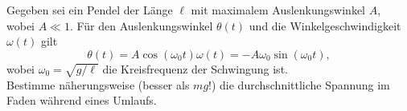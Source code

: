 \begin{Exercise}[title = Seilkraft, origin = {Morin - Classical Mechanics}, difficulty = 3, label = pucks]
Gegeben sei ein Pendel der Länge $\ell$ mit maximalem Auslenkungswinkel $A$, wobei $A \ll 1$. Für den Auslenkungswinkel $\theta(t)$ und die Winkelgeschwindigkeit $\omega(t)$ gilt
\begin{subequations}\label{averagetension:simpleharmonic}
	\begin{equation}\label{averagetension:angle}
		\theta(t) = A\cos\left(\omega_0t\right)
	\end{equation}
	\begin{equation}\label{averagtension:angularvel}
		\omega(t) = -A\omega_0\sin\left(\omega_0t\right),
	\end{equation}
\end{subequations}
wobei $\omega_0 = \sqrt{g/\ell}$ die Kreisfrequenz der Schwingung ist.\\
Bestimme näherungsweise (besser als $mg$!) die durchschnittliche Spannung im Faden während eines Umlaufs.
\end{Exercise}

